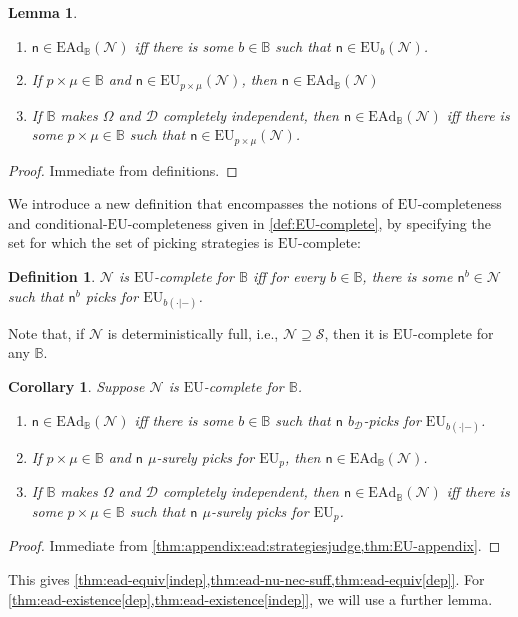 \documentclass[a4paper,final]{article}
\newtheorem{definition}[theorem]{Definition}
\newtheorem{lemma}[theorem]{Lemma}
\newtheorem{corollary}[theorem]{Corollary}
\newcommand\EU{\mathrm{EU}}
\newcommand\EAd{\mathrm{EAd}}
\newcommand{\Decs}{\mathcal{D}}
\renewcommand\S{\mathcal{S}}
\newcommand{\n}{\mathsf{n}}
\renewcommand{\nu}{\n}
\newcommand\Nu{\mathcal{N}}
\newcommand{\IB}{\mathbb{B}}
\newenvironment{CCM rewritten}
{\begingroup\color{blue}} %
{\endgroup}              %
\begin{document}
\begin{lemma}\label{thm:appendix:ead:strategiesjudge}\ 
	\begin{enumerate}[label=\normalfont(\roman*), ref=\roman*]
		\item $\nu\in\EAd_\IB(\Nu)$ iff there is some $b\in\IB$ such that $\nu\in\EU_b(\Nu)$.  
		\item If $p\times\mu\in \IB$ and $\nu\in\EU_{p\times\mu}(\Nu)$, then $\nu\in\EAd_\IB(\Nu)$ 
		\item If $\IB$ makes $\Omega$ and $\Decs$ completely independent, then $\nu\in\EAd_\IB(\Nu)$ iff there is some $p\times\mu\in\IB$ such that $\nu\in\EU_{p\times\mu}(\Nu)$.  
	\end{enumerate}
\end{lemma}
\begin{proof}
	Immediate from definitions. 
\end{proof}
We introduce a new definition that encompasses the notions of $\EU$-completeness and conditional-$\EU$-completeness given in \cref{def:EU-complete}, by specifying the set for which the set of picking strategies is $\EU$-complete: 
\begin{definition}
	$\Nu$ is $\EU$-complete for $\IB$ iff for every $b\in\IB$, there is some $\nu^b\in\Nu$ such that $\nu^b$ picks for $\EU_{b(\cdot|-)}$. 
\end{definition}
Note that, if $\Nu$ is deterministically full, i.e., $\Nu\supseteq\S$, then it is $\EU$-complete for any $\IB$. 
\begin{corollary}\label{thm:appendix:ead:eu}
	Suppose $\Nu$ is $\EU$-complete for $\IB$.
	\begin{enumerate}[label=\normalfont(\roman*), ref=(\roman*)]
		\item $\nu\in\EAd_\IB(\Nu)$ iff there is some $b\in\IB$ such that $\nu$ $b_\Decs$-picks for $\EU_{b(\cdot|-)}$.  
		\item \label{itm:ead:2}If $p\times\mu\in \IB$ and $\nu$ $\mu$-surely picks for $\EU_p$, then $\nu\in\EAd_\IB(\Nu)$.
		\item If $\IB$ makes $\Omega$ and $\Decs$ completely independent, then $\nu\in\EAd_\IB(\Nu)$ iff there is some $p\times\mu\in\IB$ such that $\nu$ $\mu$-surely picks for $\EU_p$.
	\end{enumerate}
\end{corollary}
\begin{proof}
	Immediate from \cref{thm:appendix:ead:strategiesjudge,thm:EU-appendix}.
\end{proof}
This gives \cref{thm:ead-equiv[indep],thm:ead-nu-nec-suff,thm:ead-equiv[dep]}. For \cref{thm:ead-existence[dep],thm:ead-existence[indep]}, we will use a further lemma. 
\end{document}
